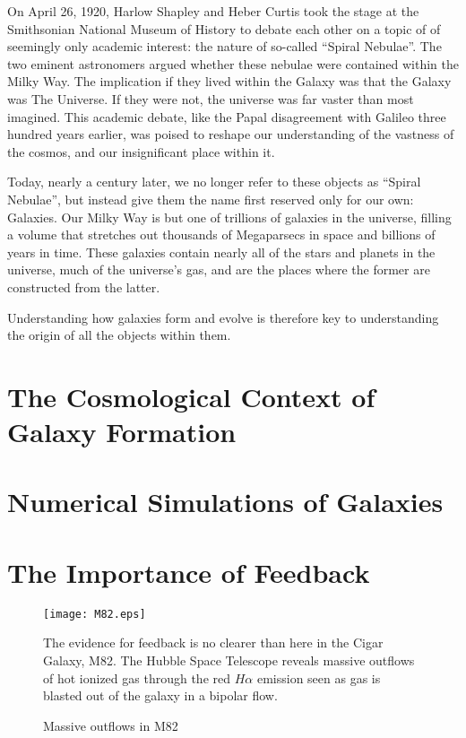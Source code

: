 On April 26, 1920, Harlow Shapley and Heber Curtis took the stage at the
Smithsonian National Museum of History to debate each other on a topic of of
seemingly only academic interest: the nature of so-called ``Spiral Nebulae''.
The two eminent astronomers argued whether these nebulae were contained within
the Milky Way.  The implication if they lived within the Galaxy was that the
Galaxy was The Universe.  If they were not, the universe was far vaster than
most imagined.  This academic debate, like the Papal disagreement with Galileo
three hundred years earlier, was poised to reshape our understanding of the
vastness of the cosmos, and our insignificant place within it.

Today, nearly a century later, we no longer refer to these objects as ``Spiral
Nebulae'', but instead give them the name first reserved only for our own:
Galaxies.  Our Milky Way is but one of trillions of galaxies in the universe,
filling a volume that stretches out thousands of Megaparsecs in space and
billions of years in time.  These galaxies contain nearly all of the stars and
planets in the universe, much of the universe's gas, and are the places where
the former are constructed from the latter.

Understanding how galaxies form and evolve is therefore key to understanding the
origin of all the objects within them.


\section{The Cosmological Context of Galaxy Formation}
\section{Numerical Simulations of Galaxies}
\section{The Importance of Feedback}
\begin{figure}
    \texttt{[image: M82.eps]}
    \caption{Massive outflows in M82}{The evidence for feedback is no clearer
    than here in the Cigar Galaxy, M82.  The Hubble Space Telescope reveals
    massive outflows of hot ionized gas through the red $H\alpha$ emission seen
    as gas is blasted out of the galaxy in a bipolar flow.}
\end{figure}
